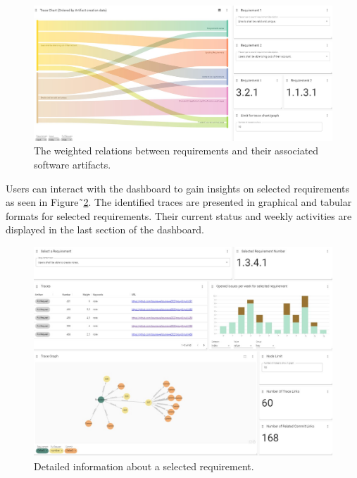 \begin{figure}[htb]
    \centering
    \includegraphics[width=.9\linewidth]{figs/sankey.jpg}
    \caption{The weighted relations between requirements and their associated software artifacts.}
    \label{fig:sankey}
\end{figure}

Users can interact with the dashboard to gain insights on selected requirements as seen in Figure˜\ref{fig:perreq}. 
The identified traces are presented in graphical and tabular formats for  selected requirements.
Their  current status and weekly activities are displayed in the last section of the dashboard.

\begin{figure}[htb]
    \centering
    \includegraphics[width=.9\linewidth]{figs/perreq.jpg}
    \caption{Detailed information about a selected requirement.}
    \label{fig:perreq}
\end{figure}

